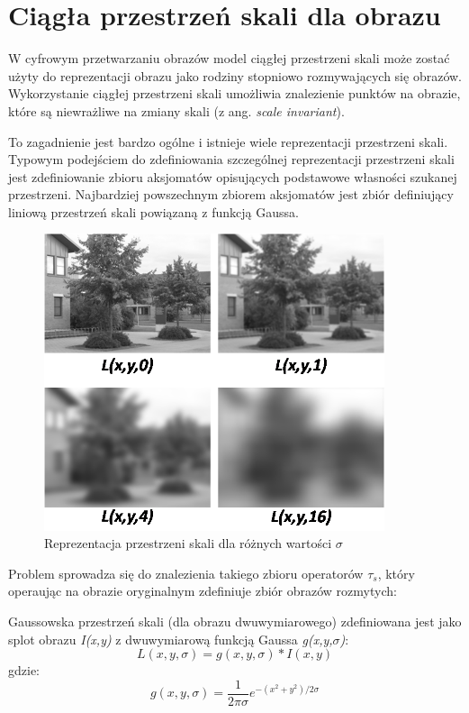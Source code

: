 \section{Ciągła przestrzeń skali dla obrazu}
\label{sec:StateSpace}
W cyfrowym przetwarzaniu obrazów model ciągłej przestrzeni skali może zostać użyty do reprezentacji obrazu jako rodziny stopniowo rozmywających się obrazów. Wykorzystanie ciągłej przestrzeni skali umożliwia znalezienie punktów na obrazie, które są niewrażliwe na zmiany skali (z ang. \textit{scale invariant}). 

To zagadnienie jest bardzo ogólne i istnieje wiele reprezentacji przestrzeni skali. Typowym podejściem do zdefiniowania szczególnej reprezentacji przestrzeni skali jest zdefiniowanie zbioru aksjomatów opisujących podstawowe własności szukanej przestrzeni. Najbardziej powszechnym zbiorem aksjomatów jest zbiór definiujący liniową przestrzeń skali powiązaną z funkcją Gaussa. 

\begin{figure}[h]
	\includegraphics[width=10cm]{ScaleSpaceRepresentation}
	\centering
	\caption{Reprezentacja przestrzeni skali dla różnych wartości $\sigma$}
	\label{im: Scale Space Representation}
\end{figure} 

Problem sprowadza się do znalezienia takiego zbioru operatorów $\tau_s$, który operaując na obrazie oryginalnym zdefiniuje zbiór obrazów rozmytych:  

Gaussowska przestrzeń skali (dla obrazu dwuwymiarowego) zdefiniowana jest jako splot obrazu \textit{I(x,y)} z dwuwymiarową funkcją Gaussa \textit{g(x,y,$\sigma$)}:
\begin{equation}
L(x,y,\sigma) = g(x,y,\sigma)*I(x,y)
\end{equation}
gdzie:
\begin{equation}
g(x,y,\sigma) = \frac{1}{2\pi\sigma}e^{-(x^2+y^2)/2\sigma}
\end{equation}

